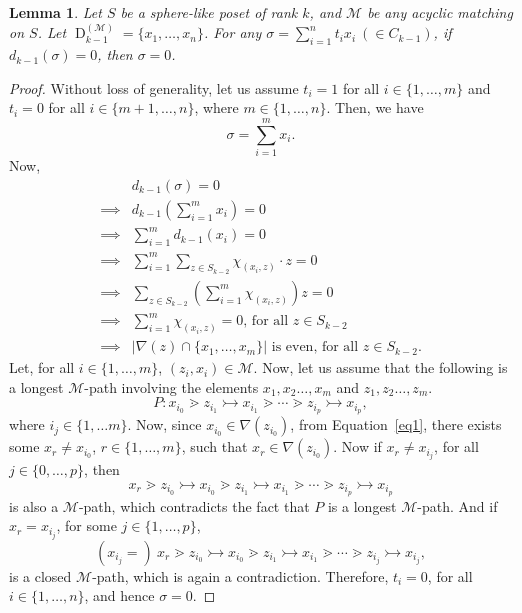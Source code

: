 \documentclass[12pt]{article}
\newtheorem{lemma}[theorem]{Lemma}
\theoremstyle{definition}
\theoremstyle{remark}
\newcommand{\dn}{\operatorname{D}}
\newcommand{\M}{\mathcal{M}}
\begin{document}
     \begin{lemma}\label{dn}
     	Let $S$ be a sphere-like poset of rank $k$, and $\M$ be any acyclic matching on
     	 $S$. Let $ \dn_{k-1}^{(\M)}=\{x_1,\ldots,x_n\}$. For any $\sigma=\sum_{i=1}^n t_ix_i ~(\in C_{k-1})$, if $d_{k-1}(\sigma)=0$, then $\sigma=0$.
     \end{lemma}
     \begin{proof}
        Without loss of generality, let us assume $t_i=1$ for all $i\in \{1,\ldots,m\}$ and $t_i=0$ for all $i\in \{m+1,\ldots,n\}$, where $m\in  \{1,\ldots,n\}$. Then, we have
        \[\sigma=\sum^m_{i=1} x_i.\]  
        Now, 
        \begin{align} \label{eq1}
           \nonumber &d_{k-1}(\sigma)=0\\
        	\nonumber \implies & d_{k-1}(\sum^m_{i=1} x_i)=0\\
            \nonumber \implies & 	\sum^m_{i=1} d_{k-1}(x_i)=0\\
            \nonumber \implies & \sum_{i=1}^{m} \sum_{z\in S_{k-2}} \chi_{(x_i,z)} \cdot  z=0\\
            \nonumber \implies &  \sum_{z\in S_{k-2}} \left( \sum_{i=1}^{m}  \chi_{(x_i,z)} \right)  z=0\\
           \nonumber  \implies & \sum_{i=1}^{m}  \chi_{(x_i,z)} = 0\text{, for all } z \in S_{k-2}\\
            \implies & | \nabla(z) \cap \{x_1,\ldots,x_m\}| \text{ is even, for all }z \in S_{k-2}.
        \end{align} 
       Let, for all $i\in \{1,\ldots,m\}$, $(z_i,x_i)\in \M$. Now, let us assume that the following is a longest $\M$-path involving the elements $x_1,x_2\ldots,x_m$ and $z_1,z_2\ldots,z_m$.
       \[P:x_{i_0} \gtrdot z_{i_1} \rightarrowtail x_{i_1}\gtrdot \cdots \gtrdot z_{i_p} \rightarrowtail x_{i_p},\]
       where $i_j \in \{1,\ldots m\}$. Now, since $x_{i_0} \in \nabla(z_{i_0})$, from Equation~\eqref{eq1}, there exists some $x_r\neq x_{i_0}$, $r\in \{1,\ldots,m\}$, such that $x_r\in \nabla(z_{i_0})$. Now if $x_r\neq x_{i_j}$, for all $j\in\{0,\ldots,p\}$, then 
       \[x_r \gtrdot z_{i_0} \rightarrowtail x_{i_0} \gtrdot z_{i_1} \rightarrowtail x_{i_1}\gtrdot \cdots \gtrdot z_{i_p} \rightarrowtail x_{i_p}\]
       is also a $\M$-path, which contradicts the fact that $P$ is a longest $\M$-path. And if  $x_r= x_{i_j}$, for some $j\in \{1,\ldots,p\}$, 
       \[(x_{i_j}=)~x_r \gtrdot z_{i_0} \rightarrowtail x_{i_0} \gtrdot z_{i_1} \rightarrowtail x_{i_1}\gtrdot \cdots \gtrdot z_{i_j} \rightarrowtail x_{i_j},\]
       is a closed $\M$-path, which is again a contradiction. Therefore, $t_i=0$, for all $i\in \{1, \ldots, n\}$, and hence $\sigma=0$.    
       
      
     \end{proof}
\end{document}
